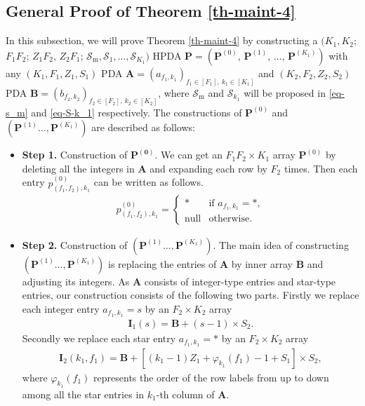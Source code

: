 \documentclass[onecolumn,10pt]{IEEEtran}
\theoremstyle{mythm}
\begin{document}
{\begin{itemize}
\end{itemize}


\subsection{ General Proof of Theorem \ref{th-maint-4}}
\label{proof:Th3}
In this subsection, we will prove Theorem \ref{th-maint-4} by constructing a $(K_1,K_2$; $F_1F_2$; $Z_1F_2$, $Z_2F_1$;  $\mathcal{S}_\text{m},\mathcal{S}_{1},\ldots,\mathcal{S}_{K_1})$ HPDA $\mathbf{P}= \left(\mathbf{P}^{(0)}\right.$, $\mathbf{P}^{(1)}$, $\ldots$, $\left.\mathbf{P}^{(K_1)}\right)$ with any $(K_1,F_1,Z_1,S_1)$ PDA $\mathbf{A}=(a_{f_1,k_1})_{f_1\in[F_1],\ k_1\in[K_1]}$ and $(K_2,F_2,Z_2,S_2)$ PDA $\mathbf{B}=(b_{f_2,k_2})_{f_2\in[F_2],\ k_2\in[K_2]}$, where $\mathcal{S}_\text{m}$ and $\mathcal{S}_{k_1}$ will be proposed in \eqref{eq-s_m} and \eqref{eq-S-k_1} respectively. The constructions of $\mathbf{P}^{(0)}$ and  $\left(\mathbf{P}^{(1)}\ldots, \mathbf{P}^{(K_1)} \right)$ are described  as follows:
\begin{itemize}
\item{\bf Step 1.} Construction of $\mathbf{P^{(0)}}$.
We can get an $F_1F_2\times K_1$ array $\mathbf{P}^{(0)}$ by deleting all the integers in $\mathbf{A}$ and expanding each row by $F_2$ times.  Then each entry $p^{(0)}_{(f_1,f_2),k_1}$ can be written as follows.
\begin{eqnarray}
\label{eq-mirror-cache}
p^{(0)}_{(f_1,f_2),k_1}=\left\{\begin{array}{cc}
                  * & \text{if } a_{f_1,k_1}=*,\\
                  \text{null} & \text{otherwise}.
                \end{array}\right.
\end{eqnarray} %
\item{\bf Step 2.} Construction of $\left(\mathbf{P}^{(1)}\ldots, \mathbf{P}^{(K_1)} \right)$.
The main idea of constructing $\left(\mathbf{P}^{(1)}\ldots, \mathbf{P}^{(K_1)} \right)$ is replacing the entries of $\mathbf{A}$ by inner array $\mathbf{B}$ and adjusting its integers. As $\mathbf{A}$ consists of integer-type entries and star-type entries, our construction consists of the following two parts. Firstly we replace each integer entry $a_{f_1,k_1}=s$ by an $F_2\times K_2$ array
\begin{eqnarray}
\label{eq-type-I}
\mathbf{I}_1(s)=\mathbf{B}+(s-1)\times S_2.
\end{eqnarray} Secondly we replace each star entry $a_{f_1,k_1}=*$ by an $F_2\times K_2$ array
\begin{eqnarray}
\label{eq-type-II}
\mathbf{I}_2(k_1,f_1)=\mathbf{B}+[(k_1-1)Z_1+\varphi_{k_1}(f_1)-1+S_1]\times S_2,
\end{eqnarray} where $\varphi_{k_1}(f_1)$ represents the order of the row labels from up to down among all the star entries in $k_1$-th column of $\mathbf{A}$.


\end{itemize}}
\end{document}
